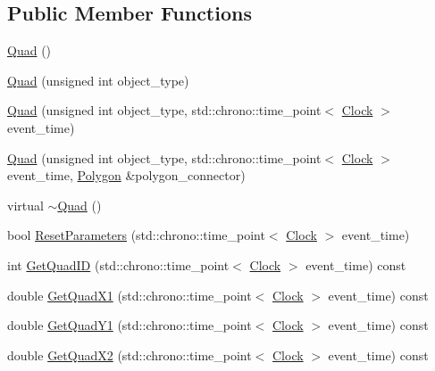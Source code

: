 \subsection*{Public Member Functions}
\begin{DoxyCompactItemize}
\item 
\mbox{\hyperlink{classQuad_ae446d188d645cc5c512336f25d1a697a}{Quad}} ()
\item 
\mbox{\hyperlink{classQuad_a8a0b4e52a52ac35a4a78fac3a0cd36b8}{Quad}} (unsigned int object\+\_\+type)
\item 
\mbox{\hyperlink{classQuad_aa22093808d9a84db2bf826ccacee415e}{Quad}} (unsigned int object\+\_\+type, std\+::chrono\+::time\+\_\+point$<$ \mbox{\hyperlink{universe_8h_a0ef8d951d1ca5ab3cfaf7ab4c7a6fd80}{Clock}} $>$ event\+\_\+time)
\item 
\mbox{\hyperlink{classQuad_a4bb08fd4d953ce61076ed06b51ee2793}{Quad}} (unsigned int object\+\_\+type, std\+::chrono\+::time\+\_\+point$<$ \mbox{\hyperlink{universe_8h_a0ef8d951d1ca5ab3cfaf7ab4c7a6fd80}{Clock}} $>$ event\+\_\+time, \mbox{\hyperlink{classPolygon}{Polygon}} \&polygon\+\_\+connector)
\item 
virtual \mbox{\hyperlink{classQuad_a64a53d5b7a7811c34a85054828f74866}{$\sim$\+Quad}} ()
\item 
bool \mbox{\hyperlink{classQuad_af7c18022d7db1ad20bb7a1e1bd1ffb90}{Reset\+Parameters}} (std\+::chrono\+::time\+\_\+point$<$ \mbox{\hyperlink{universe_8h_a0ef8d951d1ca5ab3cfaf7ab4c7a6fd80}{Clock}} $>$ event\+\_\+time)
\item 
int \mbox{\hyperlink{classQuad_aba78e3b63f568529fcae1cfa6c3c54bf}{Get\+Quad\+ID}} (std\+::chrono\+::time\+\_\+point$<$ \mbox{\hyperlink{universe_8h_a0ef8d951d1ca5ab3cfaf7ab4c7a6fd80}{Clock}} $>$ event\+\_\+time) const
\item 
double \mbox{\hyperlink{classQuad_a7b0e34a18832713528b861f7ed35e139}{Get\+Quad\+X1}} (std\+::chrono\+::time\+\_\+point$<$ \mbox{\hyperlink{universe_8h_a0ef8d951d1ca5ab3cfaf7ab4c7a6fd80}{Clock}} $>$ event\+\_\+time) const
\item 
double \mbox{\hyperlink{classQuad_ac7b0d27994149531dcd81eacca4e1a5c}{Get\+Quad\+Y1}} (std\+::chrono\+::time\+\_\+point$<$ \mbox{\hyperlink{universe_8h_a0ef8d951d1ca5ab3cfaf7ab4c7a6fd80}{Clock}} $>$ event\+\_\+time) const
\item 
double \mbox{\hyperlink{classQuad_a2974623eaf17fe5bef35e8c4638149d6}{Get\+Quad\+X2}} (std\+::chrono\+::time\+\_\+point$<$ \mbox{\hyperlink{universe_8h_a0ef8d951d1ca5ab3cfaf7ab4c7a6fd80}{Clock}} $>$ event\+\_\+time) const

\end{DoxyCompactItemize}
